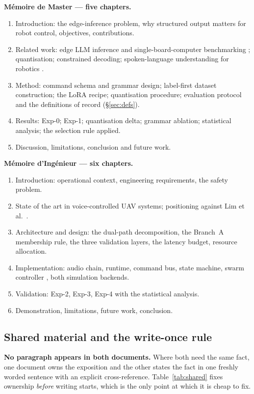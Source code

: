 \documentclass[11pt,a4paper]{article}
\begin{document}
\noindent\textbf{M\'emoire de Master --- five chapters.}
\begin{enumerate}[leftmargin=1.6em,itemsep=2pt,topsep=3pt]
  \item Introduction: the edge-inference problem, why structured output matters for robot control,
        objectives, contributions.
  \item Related work: edge LLM inference and single-board-computer benchmarking \cite{sbc2025};
        quantisation; constrained decoding; spoken-language understanding for robotics \cite{massive}.
  \item Method: command schema and grammar design; label-first dataset construction; the LoRA recipe;
        quantisation procedure; evaluation protocol and the definitions of record (\S\ref{sec:defs}).
  \item Results: Exp-0; Exp-1; quantisation delta; grammar ablation; statistical analysis; the selection
        rule applied.
  \item Discussion, limitations, conclusion and future work.
\end{enumerate}

\noindent\textbf{M\'emoire d'Ing\'enieur --- six chapters.}
\begin{enumerate}[leftmargin=1.6em,itemsep=2pt,topsep=3pt]
  \item Introduction: operational context, engineering requirements, the safety problem.
  \item State of the art in voice-controlled UAV systems; positioning against Lim et al.\ \cite{lim2025}.
  \item Architecture and design: the dual-path decomposition, the Branch~A membership rule, the three
        validation layers, the latency budget, resource allocation.
  \item Implementation: audio chain, runtime, command bus, state machine, swarm controller
        \cite{reynolds1987}, both simulation backends.
  \item Validation: Exp-2, Exp-3, Exp-4 with the statistical analysis.
  \item Demonstration, limitations, future work, conclusion.
\end{enumerate}

\subsection{Shared material and the write-once rule}

\textbf{No paragraph appears in both documents.} Where both need the same fact, one document owns the
exposition and the other states the fact in one freshly worded sentence with an explicit cross-reference.
Table~\ref{tab:shared} fixes ownership \emph{before} writing starts, which is the only point at which it
is cheap to fix.
\end{document}
